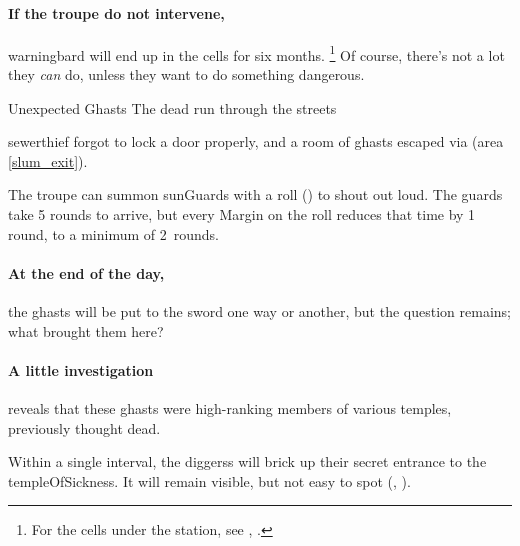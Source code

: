 \paragraph{If the troupe do not intervene,}
\gls{warningbard} will end up in the cells for six months.
\footnote{For the cells under the  station, see , .}
Of course, there's not a lot they \emph{can} do, unless they want to do something dangerous.

\warningbard


{Unexpected Ghasts}%
{The dead run through the streets}%

\Gls{sewerthief} forgot to lock a door properly, and a room of ghasts escaped via  (area \vref{slum_exit}).

The troupe can summon \glspl{sunGuard} with a  roll (\tn[7]) to shout out loud.
The guards take 5 \glspl{round} to arrive, but every Margin on the roll reduces that time by 1 \gls{round}, to a minimum of 2~\glspl{round}.

\paragraph{At the end of the day,}
the ghasts will be put to the sword one way or another, but the question remains; what brought them here?

\paragraph{A little investigation}
reveals that these ghasts were high-ranking members of various temples, previously thought dead.

Within a single \gls{interval}, the \glspl{diggers} will brick up their secret entrance to the \gls{templeOfSickness}.
It will remain visible, but not easy to spot (, \tn[12]).



